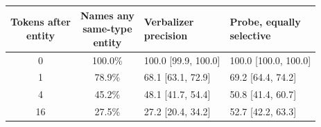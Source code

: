 \begin{tabular}{@{}ccll@{}}
\toprule
\shortstack[l]{Tokens after\\entity} & \shortstack[l]{Names any\\same-type\\entity} & \shortstack[l]{Verbalizer\\precision} & \shortstack[l]{Probe, equally\\selective} \\
\midrule
0 & 100.0\% & 100.0 {\scriptsize[99.9, 100.0]} & 100.0 {\scriptsize[100.0, 100.0]} \\
1 & 78.9\% & 68.1 {\scriptsize[63.1, 72.9]} & 69.2 {\scriptsize[64.4, 74.2]} \\
4 & 45.2\% & 48.1 {\scriptsize[41.7, 54.4]} & 50.8 {\scriptsize[41.4, 60.7]} \\
16 & 27.5\% & 27.2 {\scriptsize[20.4, 34.2]} & 52.7 {\scriptsize[42.2, 63.3]} \\
\bottomrule
\end{tabular}

